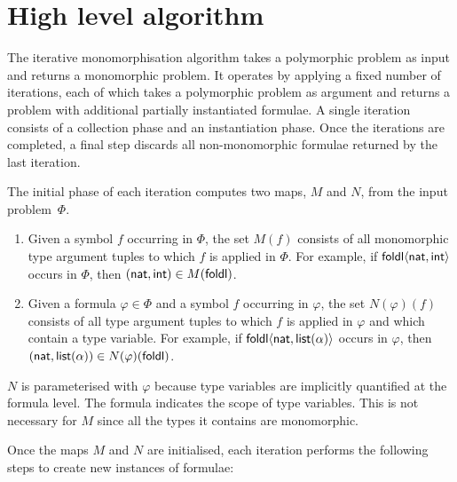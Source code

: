 \documentclass[runningheads]{llncs}
\begin{document}
\section{High level algorithm}
\label{sec:high level-algorithm}

The iterative monomorphisation algorithm takes a polymorphic problem as input and returns a monomorphic problem. It operates by applying a fixed number of iterations, each of which takes a polymorphic problem as argument and returns a problem with additional partially instantiated formulae. A single iteration consists of a collection phase and an instantiation phase. Once the iterations are completed, a final step discards all non-monomorphic formulae returned by the last iteration.

The initial phase of each iteration computes two maps, \(M\) and \(N\), from the input problem~$\Phi$.
%
\begin{enumerate}
\item[\labelitemi] Given a symbol \(f\) occurring in \(\Phi\), the set \(M(f)\) consists of all monomorphic type argument tuples to which \(f\) is applied in \(\Phi\). For example, if \(\textsf{foldl}\langle \textsf{nat}, \textsf{int}\rangle\) occurs in \(\Phi\), then \((\textsf{nat}, \textsf{int}) \in M(\textsf{foldl}) \).

\item[\labelitemi] Given a formula \(\varphi \in \Phi\) and a symbol \(f\) occurring in \(\varphi\), the set \(N(\varphi)(f)\) consists of all type argument tuples to which \(f\) is applied in \(\varphi\) and which contain a type variable. For example, if \(\textsf{foldl}\langle \textsf{nat}, \textsf{list}(\alpha)\rangle\) occurs in \(\varphi\), then \((\textsf{nat}, \textsf{list}(\alpha)) \in N(\varphi)(\textsf{foldl}) \).
\end{enumerate}

\(N\) is parameterised with \(\varphi\) because type variables are implicitly quantified at the formula level. The formula indicates the scope of type variables. This is not necessary for \(M\) since all the types it contains are monomorphic.

Once the maps \(M\) and \(N\) are initialised, each iteration performs the following steps to create new instances of formulae:
\end{document}
